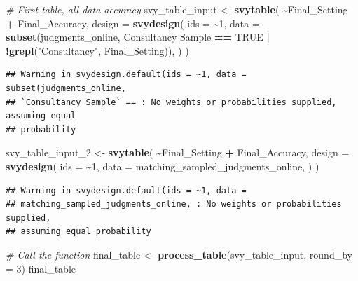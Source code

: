 \documentclass[
]{article}
\newenvironment{Shaded}{\begin{snugshade}}{\end{snugshade}}
\newcommand{\AttributeTok}[1]{\textcolor[rgb]{0.13,0.29,0.53}{#1}}
\newcommand{\CommentTok}[1]{\textcolor[rgb]{0.56,0.35,0.01}{\textit{#1}}}
\newcommand{\ConstantTok}[1]{\textcolor[rgb]{0.56,0.35,0.01}{#1}}
\newcommand{\DecValTok}[1]{\textcolor[rgb]{0.00,0.00,0.81}{#1}}
\newcommand{\FunctionTok}[1]{\textcolor[rgb]{0.13,0.29,0.53}{\textbf{#1}}}
\newcommand{\NormalTok}[1]{#1}
\newcommand{\OtherTok}[1]{\textcolor[rgb]{0.56,0.35,0.01}{#1}}
\newcommand{\SpecialCharTok}[1]{\textcolor[rgb]{0.81,0.36,0.00}{\textbf{#1}}}
\newcommand{\StringTok}[1]{\textcolor[rgb]{0.31,0.60,0.02}{#1}}
\begin{document}
\begin{Shaded}
\begin{Highlighting}[]
\CommentTok{\# First table, all data accuracy}
\NormalTok{svy\_table\_input }\OtherTok{\textless{}{-}} \FunctionTok{svytable}\NormalTok{(}
  \SpecialCharTok{\textasciitilde{}}\NormalTok{Final\_Setting }\SpecialCharTok{+}\NormalTok{ Final\_Accuracy, }
  \AttributeTok{design =} \FunctionTok{svydesign}\NormalTok{(}
    \AttributeTok{ids =} \SpecialCharTok{\textasciitilde{}}\DecValTok{1}\NormalTok{, }
    \AttributeTok{data =} \FunctionTok{subset}\NormalTok{(judgments\_online, }\StringTok{\textasciigrave{}}\AttributeTok{Consultancy Sample}\StringTok{\textasciigrave{}} \SpecialCharTok{==} \ConstantTok{TRUE} \SpecialCharTok{|} \SpecialCharTok{!}\FunctionTok{grepl}\NormalTok{(}\StringTok{"Consultancy"}\NormalTok{, Final\_Setting)),}
\NormalTok{  )}
\NormalTok{)}
\end{Highlighting}
\end{Shaded}

\begin{verbatim}
## Warning in svydesign.default(ids = ~1, data = subset(judgments_online,
## `Consultancy Sample` == : No weights or probabilities supplied, assuming equal
## probability
\end{verbatim}

\begin{Shaded}
\begin{Highlighting}[]
\NormalTok{svy\_table\_input\_2 }\OtherTok{\textless{}{-}} \FunctionTok{svytable}\NormalTok{(}
  \SpecialCharTok{\textasciitilde{}}\NormalTok{Final\_Setting }\SpecialCharTok{+}\NormalTok{ Final\_Accuracy, }
  \AttributeTok{design =} \FunctionTok{svydesign}\NormalTok{(}
    \AttributeTok{ids =} \SpecialCharTok{\textasciitilde{}}\DecValTok{1}\NormalTok{, }
    \AttributeTok{data =}\NormalTok{ matching\_sampled\_judgments\_online,}
\NormalTok{  )}
\NormalTok{)}
\end{Highlighting}
\end{Shaded}

\begin{verbatim}
## Warning in svydesign.default(ids = ~1, data =
## matching_sampled_judgments_online, : No weights or probabilities supplied,
## assuming equal probability
\end{verbatim}

\begin{Shaded}
\begin{Highlighting}[]
\CommentTok{\# Call the function}
\NormalTok{final\_table }\OtherTok{\textless{}{-}} \FunctionTok{process\_table}\NormalTok{(svy\_table\_input, }\AttributeTok{round\_by =} \DecValTok{3}\NormalTok{)}
\NormalTok{final\_table}
\end{Highlighting}
\end{Shaded}
\end{document}
